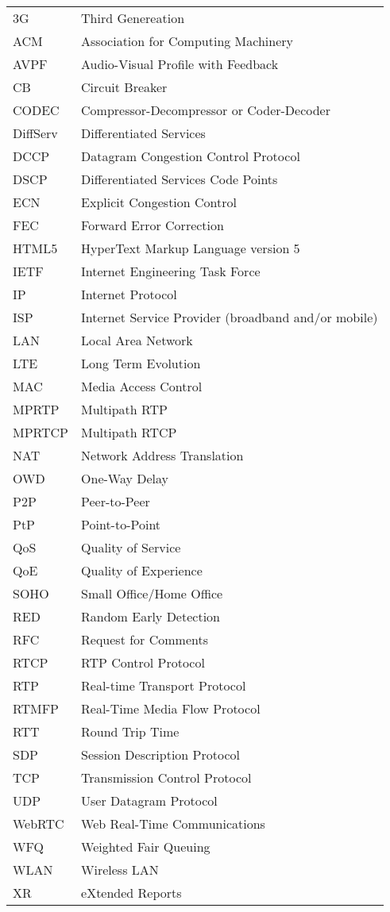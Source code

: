 \begin{longtable}{ll}
3G		& Third Genereation \\
ACM 	& Association for Computing Machinery \\
AVPF	& Audio-Visual Profile with Feedback \\
CB		& Circuit Breaker \\
CODEC	& Compressor-Decompressor or Coder-Decoder \\
DiffServ	& Differentiated Services \\
DCCP 	& Datagram Congestion Control Protocol \\
DSCP 	& Differentiated Services Code Points \\
ECN		& Explicit Congestion Control \\
FEC		& Forward Error Correction \\
HTML5	& HyperText Markup Language version 5\\
IETF	& Internet Engineering Task Force \\
IP		& Internet Protocol \\
ISP 	& Internet Service Provider (broadband and/or mobile)\\
LAN 	& Local Area Network \\
LTE 	& Long Term Evolution \\
MAC 	& Media Access Control \\
MPRTP 	& Multipath RTP \\
MPRTCP	& Multipath RTCP \\
NAT 	& Network Address Translation \\
OWD 	& One-Way Delay \\
P2P 	& Peer-to-Peer \\
PtP 	& Point-to-Point \\
QoS 	& Quality of Service \\
QoE 	& Quality of Experience \\
SOHO 	& Small Office/Home Office \\
RED 	& Random Early Detection \\
RFC 	& Request for Comments \\
RTCP 	& RTP Control Protocol \\
RTP 	& Real-time Transport Protocol \\
RTMFP	& Real-Time Media Flow Protocol \\
RTT 	& Round Trip Time \\
SDP 	& Session Description Protocol \\
TCP 	& Transmission Control Protocol \\
UDP 	& User Datagram Protocol \\
WebRTC	& Web Real-Time Communications \\
WFQ 	& Weighted Fair Queuing \\
WLAN	& Wireless LAN \\
XR		& eXtended Reports \\
\end{longtable}
